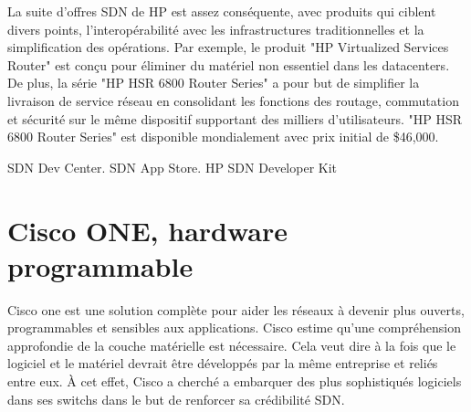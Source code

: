 


La suite d'offres SDN de HP est assez conséquente, avec produits qui ciblent divers points, l'interopérabilité avec les infrastructures traditionnelles et la simplification des opérations. Par exemple, le produit "HP Virtualized Services Router" est conçu pour éliminer du matériel non essentiel dans les \glspl{datacenter}. De plus, la série "HP HSR 6800 Router Series" a pour but de simplifier la livraison de service réseau en consolidant les fonctions des routage, commutation et sécurité sur le même dispositif supportant des milliers d'utilisateurs. "HP HSR 6800 Router Series" est disponible mondialement avec prix initial de \$46,000.


SDN Dev Center.
SDN App Store.
HP SDN Developer Kit

\section{Cisco ONE, hardware programmable}

Cisco \gls{one} est une solution complète pour aider les réseaux à devenir plus ouverts, programmables et sensibles aux applications. Cisco estime qu'une compréhension approfondie de la couche matérielle est nécessaire. Cela veut dire à la fois que le logiciel et le matériel devrait être développés par la même entreprise et reliés entre eux. À cet effet, Cisco a cherché a embarquer des plus sophistiqués logiciels dans ses switchs dans le but de renforcer sa crédibilité SDN. 

